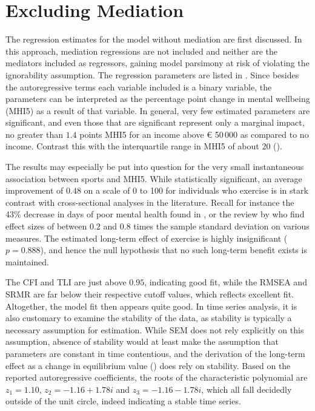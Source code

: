 \section{Excluding Mediation}
\label{sec:results:no_mediation}

The regression estimates for the model without mediation are first discussed.
In this approach, mediation regressions are not included and neither are the mediators included as regressors,
gaining model parsimony at risk of violating the ignorability assumption.
The regression parameters are listed in . Since besides the autoregressive
terms each variable included is a binary variable, the parameters can be interpreted as the percentage point change
in mental wellbeing (MHI5) as a result of that variable.
In general, very few estimated parameters are significant, and even those that are significant represent only a marginal impact,
no greater than $1.4$ points MHI5 for an income above € 50\,000 as compared to no income. Contrast this with the interquartile
range in MHI5 of about $20$ ().

The results may especially be put into question for the very small instantaneous association between sports and MHI5.
While statistically significant, an average improvement of $0.48$ on a scale of 0 to 100 for individuals who exercise
is in stark contrast with cross-sectional analyses in the literature. Recall for instance the 43\% decrease in days of poor mental
health found in , or the review by  who find effect sizes of between
$0.2$ and $0.8$ times the sample standard deviation on various measures.
The estimated long-term effect of exercise is highly insignificant ($p = 0.888$), and hence the null hypothesis that
no such long-term benefit exists is maintained.

The CFI and TLI are just above $0.95$, indicating good fit, while the RMSEA and SRMR are far below their respective
cutoff values, which reflects excellent fit. Altogether, the model fit then appears quite good.
In time series analysis, it is also customary to examine the stability of the data, as stability is typically a necessary
assumption for estimation. While SEM does not rely explicitly on this assumption, absence of stability would at least make the
assumption that parameters are constant in time contentious, and the derivation of the long-term effect as a change
in equilibrium value () does rely on stability.
Based on the reported autoregressive coefficients, the roots of the characteristic polynomial are $z_1 = 1.10$,
$z_2 = -1.16 + 1.78i$ and $z_3 = -1.16 - 1.78i$, which all fall decidedly outside of the unit circle,
indeed indicating a stable time series.


